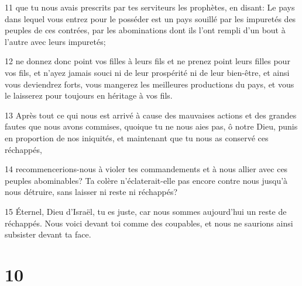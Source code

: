 \par 11 que tu nous avais prescrits par tes serviteurs les prophètes, en disant: Le pays dans lequel vous entrez pour le posséder est un pays souillé par les impuretés des peuples de ces contrées, par les abominations dont ils l'ont rempli d'un bout à l'autre avec leurs impuretés;
\par 12 ne donnez donc point vos filles à leurs fils et ne prenez point leurs filles pour vos fils, et n'ayez jamais souci ni de leur prospérité ni de leur bien-être, et ainsi vous deviendrez forts, vous mangerez les meilleures productions du pays, et vous le laisserez pour toujours en héritage à vos fils.
\par 13 Après tout ce qui nous est arrivé à cause des mauvaises actions et des grandes fautes que nous avons commises, quoique tu ne nous aies pas, ô notre Dieu, punis en proportion de nos iniquités, et maintenant que tu nous as conservé ces réchappés,
\par 14 recommencerions-nous à violer tes commandements et à nous allier avec ces peuples abominables? Ta colère n'éclaterait-elle pas encore contre nous jusqu'à nous détruire, sans laisser ni reste ni réchappés?
\par 15 Éternel, Dieu d'Israël, tu es juste, car nous sommes aujourd'hui un reste de réchappés. Nous voici devant toi comme des coupables, et nous ne saurions ainsi subsister devant ta face.

\chapter{10}

